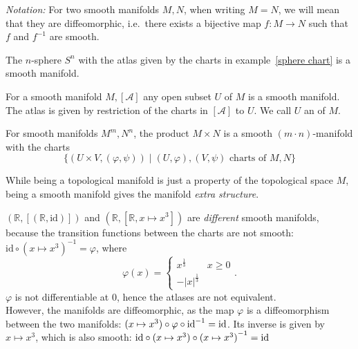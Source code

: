 \documentclass[a4paper,11pt]{article}
\begin{document}
\noindent\textit{Notation:}
    For two smooth manifolds \(M,N\), when writing \(M=N\), we will mean that they are diffeomorphic, i.e.\ there exists a bijective map \(f:M\to N\) such that \(f\) and \(f^{-1}\) are smooth. 


\begin{example}[Spheres]
    The \(n\)-sphere \(S^n\) with the atlas given by the charts in example\ \ref{sphere chart} is a smooth manifold.
\end{example}

\begin{example}
    For a smooth manifold \(M,[\mathcal{A}]\) any open subset \(U\) of \(M\) is a smooth manifold. 
    The atlas is given by restriction of the charts in \([\mathcal{A}]\) to \(U\). 
    We call \(U\) an  of \(M\).
\end{example}

\begin{example}
    For smooth manifolds \(M^m,N^n\), the product \(M\times N\) is a smooth \((m\cdot n)\)-manifold with the charts\[\{(U\times V,(\varphi,\psi))\mid(U,\varphi),(V,\psi)\text{ charts of }M,N\}\]
\end{example}


    While being a topological manifold is just a property of the topological space \(M\), being a smooth manifold gives the manifold \emph{extra structure}.


\begin{example}
    \((\mathbb{R},[(\mathbb{R},\mathrm{id})])\) and \((\mathbb{R},[\mathbb{R},x\mapsto x^3])\) are \emph{different} smooth manifolds, because the transition functions between the charts are not smooth: 
    \(\mathrm{id}\circ{(x\mapsto x^3)}^{-1}=\varphi\), where
    \[\varphi(x)=\begin{cases}x^{\frac13} & x\geq0\\ -\lvert x\rvert^{\frac13}\end{cases}.\]
    \(\varphi\) is not differentiable at 0, hence the atlases are not equivalent.\\
    However, the manifolds are diffeomorphic, as the map \(\varphi\) is a diffeomorphism between the two manifolds: 
    \((x\mapsto x^3)\circ \varphi\circ \mathrm{id}^{-1}= \mathrm{id}\). Its inverse is given by \(x\mapsto x^3\), which is also smooth: \(\mathrm{id}\circ (x\mapsto x^3)\circ{(x\mapsto x^3)}^{-1}=\mathrm{id}\)
\end{example}
\end{document}
